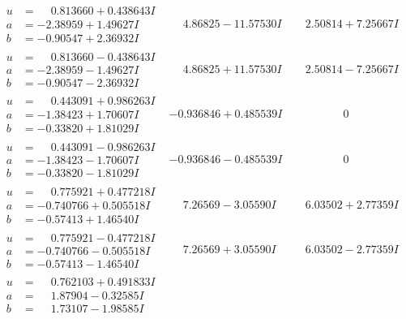 \documentclass[1p]{elsarticle_modified}
\theoremstyle{definition}
\begin{document}
$$\begin{array}{c|c|c}
\begin{aligned}
u &= \phantom{-}0.813660 + 0.438643 I \\
a &= -2.38959 + 1.49627 I \\
b &= -0.90547 + 2.36932 I\end{aligned}
 & \phantom{-}4.86825 - 11.57530 I & \phantom{-}2.50814 + 7.25667 I \\ \hline\begin{aligned}
u &= \phantom{-}0.813660 - 0.438643 I \\
a &= -2.38959 - 1.49627 I \\
b &= -0.90547 - 2.36932 I\end{aligned}
 & \phantom{-}4.86825 + 11.57530 I & \phantom{-}2.50814 - 7.25667 I \\ \hline\begin{aligned}
u &= \phantom{-}0.443091 + 0.986263 I \\
a &= -1.38423 + 1.70607 I \\
b &= -0.33820 + 1.81029 I\end{aligned}
 & -0.936846 + 0.485539 I & \phantom{-0.000000 } 0 \\ \hline\begin{aligned}
u &= \phantom{-}0.443091 - 0.986263 I \\
a &= -1.38423 - 1.70607 I \\
b &= -0.33820 - 1.81029 I\end{aligned}
 & -0.936846 - 0.485539 I & \phantom{-0.000000 } 0 \\ \hline\begin{aligned}
u &= \phantom{-}0.775921 + 0.477218 I \\
a &= -0.740766 + 0.505518 I \\
b &= -0.57413 + 1.46540 I\end{aligned}
 & \phantom{-}7.26569 - 3.05590 I & \phantom{-}6.03502 + 2.77359 I \\ \hline\begin{aligned}
u &= \phantom{-}0.775921 - 0.477218 I \\
a &= -0.740766 - 0.505518 I \\
b &= -0.57413 - 1.46540 I\end{aligned}
 & \phantom{-}7.26569 + 3.05590 I & \phantom{-}6.03502 - 2.77359 I \\ \hline\begin{aligned}
u &= \phantom{-}0.762103 + 0.491833 I \\
a &= \phantom{-}1.87904 - 0.32585 I \\
b &= \phantom{-}1.73107 - 1.98585 I\end{aligned}

\end{array}$$
\end{document}
